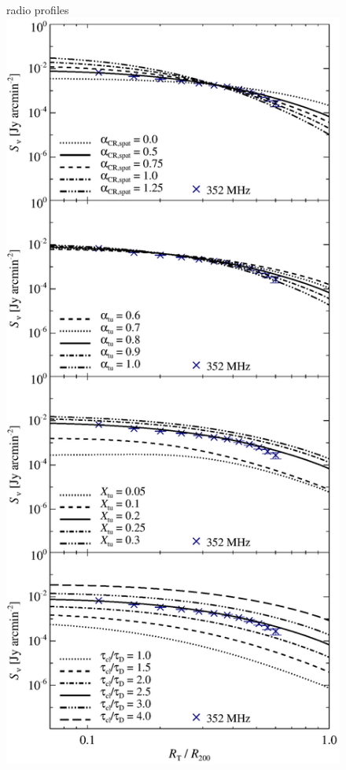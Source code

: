 \documentclass[fleqn,usenatbib,useAMS]{mnras}
\begin{document}
\begin{figure}
\begin{minipage}{1\columnwidth}
   \begin{center}\Large{radio profiles}\\
     \includegraphics[width=\columnwidth]{figure7_prof.eps}

\end{center}
\end{minipage}
\end{figure}
\end{document}
